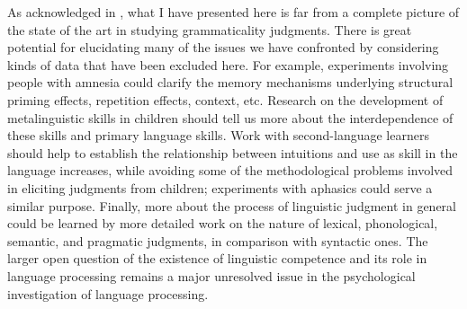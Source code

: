  As acknowledged in , what I have presented here is far from a complete picture of the state of the art in studying grammaticality judgments. There is great potential for elucidating many of the issues we have confronted by considering kinds of data that have been excluded here. For example, experiments involving people with amnesia could clarify the memory mechanisms underlying structural priming effects, repetition effects, context, etc. Research on the development of metalinguistic skills in children should tell us more about the interdependence of these skills and primary language skills. Work with second-language learners should help to establish the relationship between intuitions and use as skill in the language increases, while avoiding some of the methodological problems involved in eliciting judgments from children; experiments with aphasics could serve a similar purpose. Finally, more about the process of linguistic judgment in general could be learned by more detailed work on the nature of lexical, phonological, semantic, and pragmatic judgments, in comparison with syntactic ones. The larger open question of the existence of linguistic competence and its role in language processing remains a major unresolved issue in the psychological investigation of language processing.

